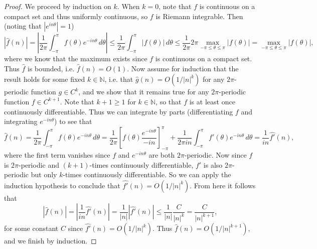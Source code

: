 \documentclass[letterpaper, 12pt]{article}
\newcommand{\N}{\mathbb{N}}
\begin{document}
\begin{proof}
  We proceed by induction on $k$. When $k = 0$, note that
  $f$ is continuous on a compact set and thus uniformly
  continuous, so $f$ is Riemann integrable. Then
  (noting that $|e^{in\theta}| = 1$)
  \[
    |\hat{f}(n)|
    = \left|\frac{1}{2\pi} \int_{-\pi}^{\pi} f(\theta) e^{-in\theta}\, d\theta \right|
    \le \frac{1}{2\pi} \int_{-\pi}^{\pi} |f(\theta)|\, d\theta
    \le \frac{1}{2\pi} 2\pi \max_{-\pi \le \theta \le \pi} |f(\theta)|
    = \max_{-\pi \le \theta \le \pi} |f(\theta)|,
  \]
  where we know that the maximum exists since $f$ is
  continuous on a compact set. Thus $\hat{f}$ is bounded,
  i.e. $\hat{f}(n) = O(1)$. Now assume for induction
  that the result
  holds for some fixed $k \in \N$, i.e.
  that $\hat{g}(n) = O(1 / |n|^k)$ for any $2\pi$-periodic
  function $g \in C^k$, and we show that
  it remains true for any $2\pi$-periodic function
  $f \in C^{k + 1}$. Note that $k + 1 \ge 1$ for
  $k \in \N$, so that
  $f$ is at least once continuously differentiable.
  Thus we can integrate by parts
  (differentiating $f$ and integrating $e^{-in\theta}$)
  to see that
  \[
    \hat{f}(n)
    = \frac{1}{2\pi} \int_{-\pi}^{\pi} f(\theta) e^{-in\theta}\, d\theta
    = \frac{1}{2\pi} \left[f(\theta) \frac{e^{-in\theta}}{-in}\right]_{-\pi}^{\pi}
    + \frac{1}{2\pi in} \int_{-\pi}^{\pi} f'(\theta) e^{-in\theta}\, d\theta
    = \frac{1}{in} \widehat{f'}(n),
  \]
  where the first term vanishes since
  $f$ and $e^{-in\theta}$ are both $2\pi$-periodic.
  Now since $f$ is $2\pi$-periodic and $(k + 1)$-times
  continuously differentiable, $f'$ is also
  $2\pi$-periodic but only $k$-times continuously
  differentiable. So we can apply the induction
  hypothesis to conclude that
  $\widehat{f'}(n) = O(1 / |n|^k)$. From here it follows
  that
  \[
    |\hat{f}(n)|
    = \left|\frac{1}{in} \widehat{f'}(n)\right|
    = \frac{1}{|n|} \left|\widehat{f'}(n)\right|
    \le \frac{1}{|n|} \frac{C}{|n|^{k}}
    = \frac{C}{|n|^{k + 1}},
  \]
  for some constant $C$ since
  $\widehat{f'}(n) = O(1 / |n|^k)$. Thus
  $\hat{f}(n) = O(1 / |n|^{k + 1})$,
  and we finish by induction.
\end{proof}
\end{document}
